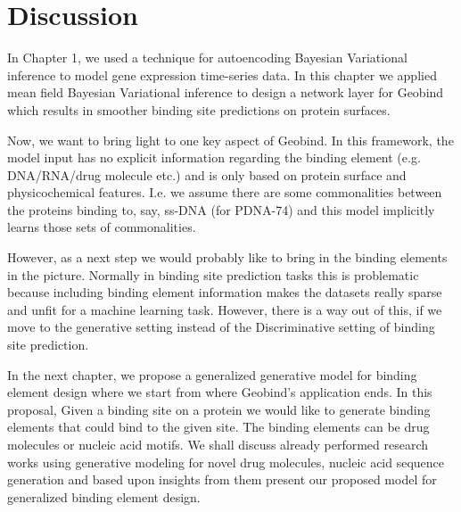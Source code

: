 \section{Discussion}
In Chapter 1, we used a technique for autoencoding Bayesian Variational inference to model gene
expression time-series data. In this chapter we applied mean field Bayesian Variational inference to
design a network layer for Geobind which results in smoother binding site predictions on protein
surfaces. 

Now, we want to bring light to one key aspect of Geobind. In this framework, the model input has no
explicit information regarding the binding element (e.g. DNA/RNA/drug molecule etc.) and is only based on
protein surface and physicochemical features. I.e. we assume there are some commonalities between the proteins binding to,
say, ss-DNA (for PDNA-74) and this model implicitly learns those sets of commonalities.

However, as a next step we would probably like to bring in the binding elements in the
picture. Normally in binding site prediction tasks this is problematic because including binding
element information makes the
datasets really sparse and unfit for a machine learning task. However, there is a way out of this,
if we move to the generative setting instead of the Discriminative setting of binding site prediction.

In the next chapter, we propose a generalized generative model for  binding element design where we
start from where Geobind's application ends. In this proposal, Given a binding site on a protein we
would like to generate binding elements that could bind to the given site. The binding elements
can be drug molecules or nucleic acid motifs. We shall discuss already performed research works
using generative modeling for novel drug molecules, nucleic acid sequence generation and based upon
insights from them present our proposed model for generalized binding element design.
